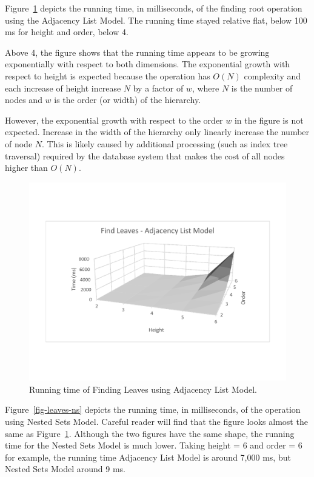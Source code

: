 Figure~\ref{fig-leaves-al} depicts the running time, in milliseconds, of the finding root operation using the Adjacency List Model. The running time stayed relative flat, below 100 ms for height and order, below 4.

Above 4, the figure shows that the running time appears to be growing exponentially with respect to both dimensions. The exponential growth with respect to height is expected because the operation has $O(N)$ complexity and each increase of height increase $N$ by a factor of $w$, where $N$ is the number of nodes and $w$ is the order (or width) of the hierarchy.

However, the exponential growth with respect to the order $w$ in the figure is not expected. Increase in the width of the hierarchy only linearly increase the number of node $N$. This is likely caused by additional processing (such as index tree traversal) required by the database system that makes the cost of all nodes higher than $O(N)$.

\begin{figure}
\begin{center}
\includegraphics[width=6in]{images/eval/leaves/al_surface.pdf}
\caption{Running time of Finding Leaves using Adjacency List Model.\label{fig-leaves-al}}
\end{center}
\end{figure}


Figure~\ref{fig-leaves-ns} depicts the running time, in milliseconds, of the operation using Nested Sets Model. Careful reader will find that the figure looks almost the same as Figure~\ref{fig-leaves-al}. Although the two figures have the same shape, the running time for the Nested Sets Model is much lower. Taking height = 6 and order = 6 for example, the running time Adjacency List Model is around 7,000 ms, but Nested Sets Model around  9 ms.

